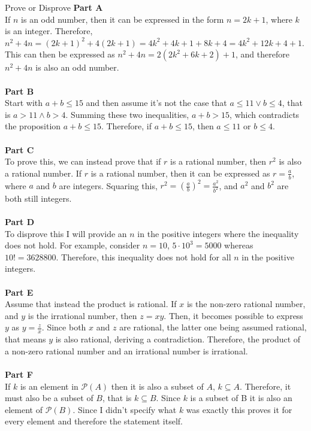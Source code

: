 \begin{homeworkProblem}{Prove or Disprove}
\textbf{Part A} \\
If $n$ is an odd number, then it can be expressed in the form $n=2k+1$, where $k$ is an integer. Therefore, $n^2+4n = (2k+1)^2+4(2k+1) = 4k^2+4k+1+8k+4 = 4k^2+12k+4+1$. This can then be expressed as $n^2+4n=2(2k^2+6k+2)+1$, and therefore $n^2+4n$ is also an odd number. 
\\ \\
\textbf{Part B} \\
Start with $a+b \leq 15$ and then assume it's not the case that $a \leq 11 \vee b \leq 4$, that is $a > 11 \wedge b > 4$. Summing these two inequalities, $a + b > 15$, which contradicts the proposition $a+b \leq 15$. Therefore, if $a+b \leq 15$, then $a \leq 11$ or $b \leq 4$.
\\ \\
\textbf{Part C} \\
To prove this, we can instead prove that if $r$ is a rational number, then $r^2$ is also a rational number. If $r$ is a rational number, then it can be expressed as $r = \frac{a}{b}$, where $a$ and $b$ are integers. Squaring this, $r^2 = \left( \frac{a}{b} \right)^2 = \frac{a^2}{b^2}$, and $a^2$ and $b^2$ are both still integers. 
\\ \\
\textbf{Part D} \\
To disprove this I will provide an $n$ in the positive integers where the inequality does not hold. For example, consider $n=10$, $5 \cdot 10^3 = 5000$ whereas $10! = 3628800$. Therefore, this inequality does not hold for all $n$ in the positive integers.
\\ \\
\textbf{Part E} \\
Assume that instead the product is rational. If $x$ is the non-zero rational number, and $y$ is the irrational number, then $z = xy$. Then, it becomes possible to express $y$ as $y=\frac{z}{x}$. Since both $x$ and $z$ are rational, the latter one being assumed rational, that means $y$ is also rational, deriving a contradiction. Therefore, the product of a non-zero rational number and an irrational number is irrational.
\\ \\
\textbf{Part F} \\
If $k$ is an element in $\mathscr{P}(A)$ then it is also a subset of $A$, $k \subseteq A$. Therefore, it must also be a subset of $B$, that is $k \subseteq B$. Since $k$ is a subset of B it is also an element of $\mathscr{P}(B)$. Since I didn't specify what $k$ was exactly this proves it for every element and therefore the statement itself. 
    
\end{homeworkProblem}